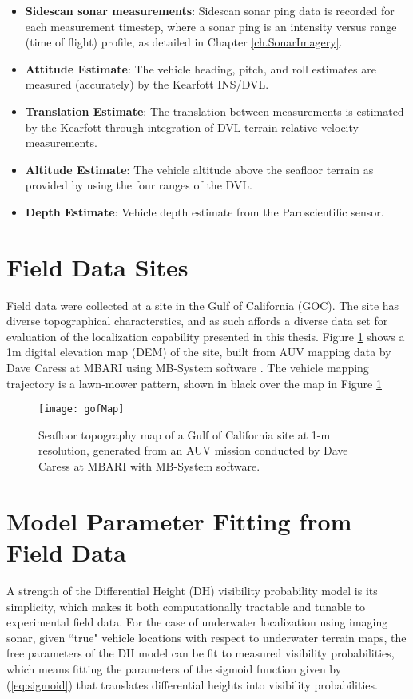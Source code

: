 \begin{itemize}
\item \textbf{Sidescan sonar measurements}: Sidescan sonar ping data is recorded for each measurement timestep, where a sonar ping is an intensity versus range (time of flight) profile, as detailed in Chapter \ref{ch.SonarImagery}.
\item \textbf{Attitude Estimate}: The vehicle heading, pitch, and roll estimates are measured (accurately) by the Kearfott INS/DVL.
\item \textbf{Translation Estimate}: The translation between measurements is estimated by the Kearfott through integration of DVL terrain-relative velocity measurements.
\item \textbf{Altitude Estimate}: The vehicle altitude above the seafloor terrain as provided by using the four ranges of the DVL.
\item \textbf{Depth Estimate}: Vehicle depth estimate from the Paroscientific sensor.
\end{itemize}

\section{Field Data Sites}
\label{auv.Field}

Field data were collected at a site in the Gulf of California (GOC).
The site has diverse topographical characterstics, and as such affords a diverse data set for evaluation of the localization capability presented in this thesis.
Figure \ref{fig:gofMapAUV} shows a 1m digital elevation map (DEM) of the site, built from AUV mapping data by Dave Caress at MBARI using MB-System software \cite{Caress2006}.
The vehicle mapping trajectory is a lawn-mower pattern, shown in black over the map in Figure \ref{fig:gofMapAUV}

\begin{figure}[!h!]
	\centering
		\texttt{[image: gofMap]}
	\caption{Seafloor topography map of a Gulf of California site at 1-m resolution, generated from an AUV mission conducted by Dave Caress at MBARI with MB-System software.}
	\label{fig:gofMapAUV}
\end{figure}

\section{Model Parameter Fitting from Field Data}
\label{auv.dhFit}

A strength of the Differential Height (DH) visibility probability model is its simplicity, which makes it both computationally tractable and tunable to experimental field data.
For the case of underwater localization using imaging sonar, given ``true" vehicle locations with respect to underwater terrain maps, the free parameters of the DH model can be fit to measured visibility probabilities, which means fitting the parameters of the sigmoid function given by (\ref{eq:sigmoid}) that translates differential heights into visibility probabilities.

